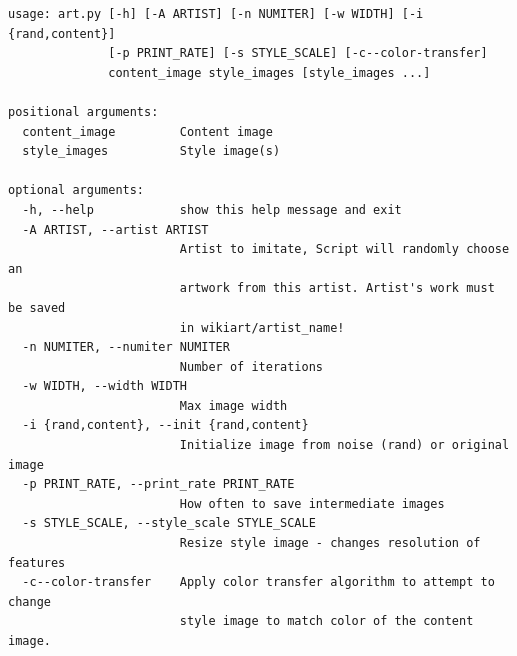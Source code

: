\documentclass[11pt,letterpaper,journal]{IEEEtran}
\begin{document}
\onecolumn
{}
\begin{verbatim}
usage: art.py [-h] [-A ARTIST] [-n NUMITER] [-w WIDTH] [-i {rand,content}]
              [-p PRINT_RATE] [-s STYLE_SCALE] [-c--color-transfer]
              content_image style_images [style_images ...]

positional arguments:
  content_image         Content image
  style_images          Style image(s)

optional arguments:
  -h, --help            show this help message and exit
  -A ARTIST, --artist ARTIST
                        Artist to imitate, Script will randomly choose an
                        artwork from this artist. Artist's work must be saved
                        in wikiart/artist_name!
  -n NUMITER, --numiter NUMITER
                        Number of iterations
  -w WIDTH, --width WIDTH
                        Max image width
  -i {rand,content}, --init {rand,content}
                        Initialize image from noise (rand) or original image
  -p PRINT_RATE, --print_rate PRINT_RATE
                        How often to save intermediate images
  -s STYLE_SCALE, --style_scale STYLE_SCALE
                        Resize style image - changes resolution of features
  -c--color-transfer    Apply color transfer algorithm to attempt to change
                        style image to match color of the content image.
\end{verbatim}
\end{document}
